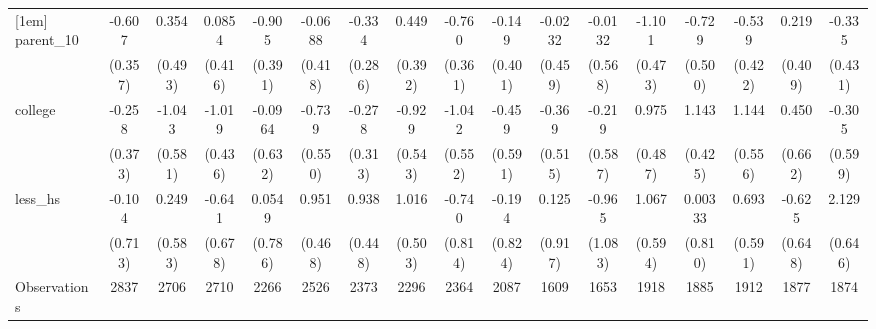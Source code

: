 {\begin{tabular}{l*{16}{c}}
[1em]
parent\_10           &      -0.607         &       0.354         &      0.0854         &      -0.905\sym{*}  &     -0.0688         &      -0.334         &       0.449         &      -0.760\sym{*}  &      -0.149         &     -0.0232         &     -0.0132         &      -1.101\sym{*}  &      -0.729         &      -0.539         &       0.219         &      -0.335         \\
                    &     (0.357)         &     (0.493)         &     (0.416)         &     (0.391)         &     (0.418)         &     (0.286)         &     (0.392)         &     (0.361)         &     (0.401)         &     (0.459)         &     (0.568)         &     (0.473)         &     (0.500)         &     (0.422)         &     (0.409)         &     (0.431)         \\
[1em]
college             &      -0.258         &      -1.043         &      -1.019\sym{*}  &     -0.0964         &      -0.739         &      -0.278         &      -0.929         &      -1.042         &      -0.459         &      -0.369         &      -0.219         &       0.975\sym{*}  &       1.143\sym{**} &       1.144\sym{*}  &       0.450         &      -0.305         \\
                    &     (0.373)         &     (0.581)         &     (0.436)         &     (0.632)         &     (0.550)         &     (0.313)         &     (0.543)         &     (0.552)         &     (0.591)         &     (0.515)         &     (0.587)         &     (0.487)         &     (0.425)         &     (0.556)         &     (0.662)         &     (0.599)         \\
[1em]
less\_hs             &      -0.104         &       0.249         &      -0.641         &      0.0549         &       0.951\sym{*}  &       0.938\sym{*}  &       1.016\sym{*}  &      -0.740         &      -0.194         &       0.125         &      -0.965         &       1.067         &     0.00333         &       0.693         &      -0.625         &       2.129\sym{***}\\
                    &     (0.713)         &     (0.583)         &     (0.678)         &     (0.786)         &     (0.468)         &     (0.448)         &     (0.503)         &     (0.814)         &     (0.824)         &     (0.917)         &     (1.083)         &     (0.594)         &     (0.810)         &     (0.591)         &     (0.648)         &     (0.646)         \\
\hline
Observations        &        2837         &        2706         &        2710         &        2266         &        2526         &        2373         &        2296         &        2364         &        2087         &        1609         &        1653         &        1918         &        1885         &        1912         &        1877         &        1874         \\

\end{tabular}}
